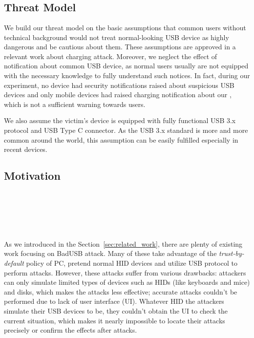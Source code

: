 \section{\tool}
\label{sec:badusb}
\subsection{Threat Model}
We build our threat model on the basic assumptions that common users without technical background would not treat normal-looking USB device as highly dangerous and be cautious about them. These assumptions are approved in a relevant work about charging attack\cite{JFCImpact}. Moreover, we neglect the effect of notification about common USB device, as normal users usually are not equipped with the necessary knowledge to fully understand such notices. In fact, during our experiment, no device had security notifications raised about suspicious USB devices and only mobile devices had raised charging notification about our \tool, which is not a sufficient warning towards users.

We also assume the victim's device is equipped with fully functional USB 3.x protocol and USB Type C connector. As the USB 3.x standard is more and more common around the world, this assumption can be easily fulfilled especially in recent devices.
\subsection{Motivation}
\noindent{}\\
\\
\\
\\
\\
As we introduced in the Section~\ref{sec:related_work}, there are plenty of existing work  focusing on BadUSB attack. 
Many of these take advantage of the \textit{trust-by-default} policy of PC, pretend normal HID devices and utilize USB protocol to perform attacks. 
However, these attacks suffer from various drawbacks:
 attackers can only simulate limited types of devices such as HIDs (like keyboards and mice) and disks, which makes the attacks less effective;
 accurate attacks couldn't be performed due to lack of user interface (UI).
Whatever HID the attackers simulate their USB devices to be, they couldn't obtain the UI to check the current situation, which makes it nearly impossible to locate their attacks precisely or confirm the effects after attacks.

